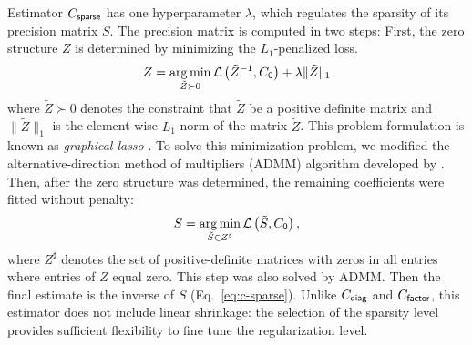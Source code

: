 \documentclass[10pt]{article}
\newcommand{\loss}[1]{\mathcal L\left(#1\right)}
\DeclareMathOperator*{\argmin}{arg\,min}
\begin{document}
Estimator $C_{\sf sparse}$  has one hyperparameter $\lambda$, which regulates the sparsity of its precision matrix $S$. The precision matrix is computed in two steps: First, the zero structure $Z$ is determined by minimizing the $L_1$-penalized loss.
\begin{equation}
Z = \argmin\limits_{\tilde Z \succ 0} \loss{{\tilde Z}^{-1},C_{\sf 0}} + \lambda \|\tilde Z \|_1
\end{equation}
where $\tilde Z\succ 0$ denotes the constraint that $\tilde Z$ be a positive definite matrix and $\|\tilde Z\|_1$ is the element-wise $L_1$ norm of the matrix $\tilde Z$. This problem formulation is known as \emph{graphical lasso} \cite{Friedman:2008}. To solve this minimization problem, we modified the alternative-direction method of multipliers (ADMM) algorithm developed by \cite{Ma:2013}. 
Then, after the zero structure was determined, the remaining coefficients were fitted without penalty:
\begin{equation}
S = \argmin\limits_{\tilde S \in Z^\sharp} \loss{\tilde S,C_{\sf 0}},
\end{equation}
where $Z^\sharp$ denotes the set of positive-definite matrices with zeros in all entries where entries of $Z$ equal zero.  This step was also solved by ADMM.  Then the final estimate is the inverse of $S$ (Eq.~\ref{eq:c-sparse}). Unlike $C_{\sf diag}$ and $C_{\sf factor}$, this estimator does not include linear shrinkage: the selection of the sparsity level provides sufficient flexibility to fine tune the regularization level.
\end{document}
